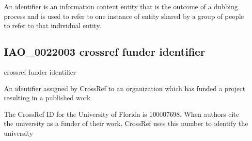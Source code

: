 \documentclass[letterpaper,10pt,english]{sphinxmanual}
\begin{document}
\begin{sphinxShadowBox}

\sphinxAtStartPar
An identifier is an information content entity that is the outcome of a dubbing process and is used to refer to one instance of entity shared by a group of people to refer to that individual entity.
\end{sphinxShadowBox}

\begin{sphinxShadowBox}

\sphinxAtStartPar
{}
\end{sphinxShadowBox}
\begin{quote}

\ignorespaces \end{quote}


\subsection{IAO\_0022003 \sphinxhyphen{} crossref funder identifier}
\label{\detokenize{doc-IAO_0022003:iao-0022003-crossref-funder-identifier}}\label{\detokenize{doc-IAO_0022003:index-0}}\label{\detokenize{doc-IAO_0022003::doc}}
\begin{sphinxShadowBox}

\sphinxAtStartPar
crossref funder identifier
\end{sphinxShadowBox}

\begin{sphinxShadowBox}

\sphinxAtStartPar
An identifier assigned by CrossRef to an organization which has funded a project resulting in a published work
\end{sphinxShadowBox}

\begin{sphinxShadowBox}

\sphinxAtStartPar
The CrossRef ID for the University of Florida is 100007698.  When authors cite the university as a funder of their work, CrossRef uses this number to identify the university
\end{sphinxShadowBox}
\end{document}
